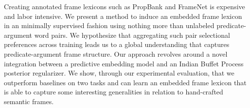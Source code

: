 Creating annotated frame lexicons such as PropBank and FrameNet is expensive and labor intensive. We present a method to induce an embedded frame lexicon in an minimally supervised fashion using nothing more than unlabeled predicate-argument word pairs. We hypothesize that aggregating such pair selectional preferences across training leads us to a global understanding that captures predicate-argument frame structure. Our approach revolves around a novel integration between a predictive embedding model and an Indian Buffet Process posterior regularizer. We show, through our experimental evaluation, that we outperform baselines on two tasks and can learn an embedded frame lexicon that is able to capture some interesting generalities in relation to hand-crafted semantic frames.
